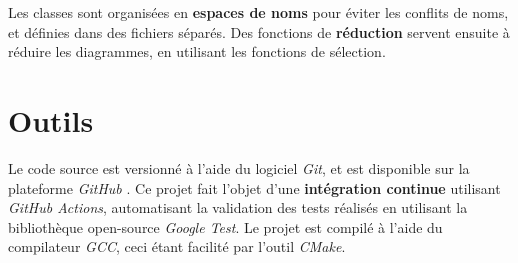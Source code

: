 Les classes sont organisées en \textbf{espaces de noms} pour éviter les conflits de noms, et définies dans des fichiers séparés. Des fonctions de \textbf{réduction} servent ensuite à réduire les diagrammes, en utilisant les fonctions de sélection.

\section{Outils}

Le code source est versionné à l'aide du logiciel \textit{Git}, et est disponible sur la plateforme \textit{GitHub} \cite{Leroy_2024}. Ce projet fait l'objet d'une \textbf{intégration continue} utilisant \textit{GitHub Actions}, automatisant la validation des tests réalisés en utilisant la bibliothèque open-source \textit{Google Test}. Le projet est compilé à l'aide du compilateur \textit{GCC}, ceci étant facilité par l'outil \textit{CMake}.